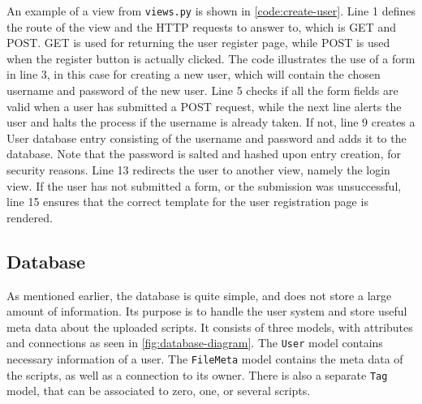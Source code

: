 \noindent An example of a view from \texttt{views.py} is shown in  \autoref{code:create-user}. Line 1 defines the route of the view and the HTTP requests to answer to, which is GET and POST. GET is used for returning the user register page, while POST is used when the register button is actually clicked. The code illustrates the use of a form in line 3, in this case for creating a new user, which will contain the chosen username and password of the new user. Line 5 checks if all the form fields are valid when a user has submitted a POST request, while the next line alerts the user and halts the process if the username is already taken. If not, line 9 creates a User database entry consisting of the username and password and adds it to the database. Note that the password is salted and hashed upon entry creation, for security reasons. Line 13 redirects the user to another view, namely the login view. If the user has not submitted a form, or the submission was unsuccessful, line 15 ensures that the correct template for the user registration page is rendered. \\


\subsection{Database} \label{sec:database}

As mentioned earlier, the database is quite simple, and does not store a large amount of information. Its purpose is to handle the user system and store useful meta data about the uploaded scripts. It consists of three models, with attributes and connections as seen in \autoref{fig:database-diagram}. The \texttt{User} model contains necessary information of a user. The \texttt{FileMeta} model contains the meta data of the scripts, as well as a connection to its owner. There is also a separate \texttt{Tag} model, that can be associated to zero, one, or several scripts.

